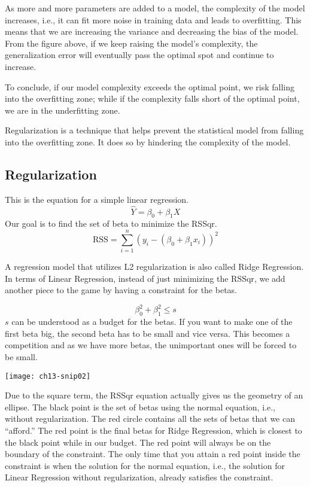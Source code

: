 As more and more parameters are added to a model, the complexity of the model increases, i.e., it can fit more noise in training data and leads to overfitting. This means that we are increasing the variance and decreasing the bias of the model. From the figure above, if we keep raising the model's complexity, the generalization error will eventually pass the optimal spot and continue to increase.

To conclude, if our model complexity exceeds the optimal point, we risk falling into the overfitting zone; while if the complexity falls short of the optimal point, we are in the underfitting zone.

Regularization is a technique that helps prevent the statistical model from falling into the overfitting zone. It does so by hindering the complexity of the model.

\subsection{Regularization}


This is the equation for a simple linear regression.
\begin{equation}
\hat{Y}=\beta_{0}+\beta_{1} X
\end{equation}
Our goal is to find the set of beta to minimize the \ac{RSSqr}.
\begin{equation}
\textrm{RSS}=\sum_{i=1}^{n}\left(y_{i}-\left(\beta_{0}+\beta_{1} x_{i}\right)\right)^{2}
\end{equation}




A regression model that utilizes L2 regularization is also called Ridge Regression. In terms of Linear Regression, instead of just minimizing the \ac{RSSqr}, we add another piece to the game by having a constraint for the betas.

\begin{equation}
\beta_{0}^{2}+\beta_{1}^{2} \leq s
\end{equation}
$s$ can be understood as a budget for the betas. If you want to make one of the first beta big, the second beta has to be small and vice versa. This becomes a competition and as we have more betas, the unimportant ones will be forced to be small.
\begin{marginfigure}
\texttt{[image: ch13-snip02]}
\end{marginfigure}
Due to the square term, the \ac{RSSqr} equation actually gives us the geometry of an ellipse. The black point is the set of betas using the normal equation, i.e., without regularization. The red circle contains all the sets of betas that we can ``afford.'' The red point is the final betas for Ridge Regression, which is closest to the black point while in our budget. The red point will always be on the boundary of the constraint. The only time that you attain a red point inside the constraint is when the solution for the normal equation, i.e., the solution for Linear Regression without regularization, already satisfies the constraint.

